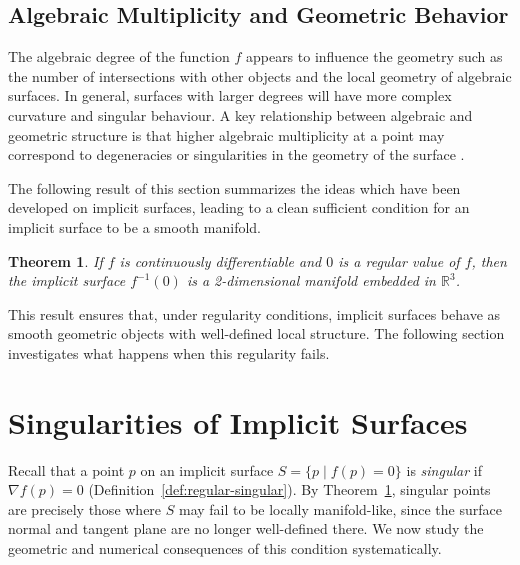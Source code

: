 \documentclass[12pt, a4paper, oneside]{book}
\theoremstyle{plain}
\newtheorem{theorem}{Theorem}[chapter]
\theoremstyle{definition}
\theoremstyle{remark}
\theoremstyle{definition}
\begin{document}
\subsection{Algebraic Multiplicity and Geometric Behavior}

The algebraic degree of the function $f$ appears to influence the geometry such as the number of intersections with other objects and the local geometry of algebraic surfaces. In general, surfaces with larger degrees will have more complex curvature and singular behaviour. A key relationship between algebraic and geometric structure is that higher algebraic multiplicity at a point may correspond to degeneracies or singularities in the geometry of the surface \cite{bloomenthal2000implicit}.

The following result of this section summarizes the ideas which have been developed on implicit surfaces, leading to a clean sufficient condition for an implicit surface to be a smooth manifold.

\begin{theorem}
\label{thm:manifold}
If $f$ is continuously differentiable and $0$ is a regular value of $f$, then the implicit surface $f^{-1}(0)$ is a 2-dimensional manifold embedded in $\mathbb{R}^3$.
\end{theorem}

This result ensures that, under regularity conditions, implicit surfaces behave as smooth geometric objects with well-defined local structure. The following section investigates what happens when this regularity fails.

\section{Singularities of Implicit Surfaces}
\label{sec:singularities}

Recall that a point $p$ on an implicit surface $S=\{p \mid f(p)=0\}$ is \emph{singular} if $\nabla f(p) = 0$ (Definition~\ref{def:regular-singular}). By Theorem~\ref{thm:manifold}, singular points are precisely those where $S$ may fail to be locally manifold-like, since the surface normal and tangent plane are no longer well-defined there. We now study the geometric and numerical consequences of this condition systematically.
\end{document}
